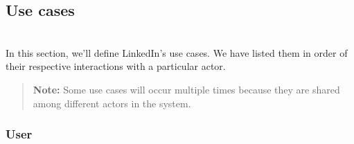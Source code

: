 \subsection{Use cases}\label{hh6mCh17hN-GtS1sKl7EU}
\\
In this section, we'll define LinkedIn's use cases. We have listed them in order of their respective interactions with a particular actor.
\begin{quote}
\textbf{Note:} Some use cases will occur multiple times because they are shared among different actors in the system.
\end{quote}
\subsubsection{User}\label{jbGOZR6lJVQJhD2ulecT1}

